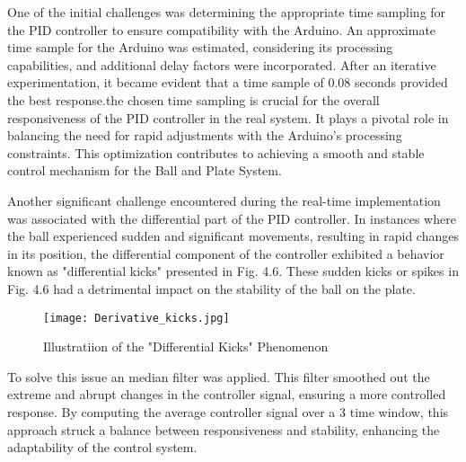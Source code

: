 One of the initial challenges was determining the appropriate time sampling for the PID controller to ensure compatibility with the Arduino. An approximate time sample for the Arduino was estimated, considering its processing capabilities, and additional delay factors were incorporated. After an iterative experimentation, it became evident that a time sample of 0.08 seconds provided the best response.the chosen time sampling is crucial for the overall responsiveness of the PID controller in the real system. It plays a pivotal role in balancing the need for rapid adjustments with the Arduino's processing constraints. This optimization contributes to achieving a smooth and stable control mechanism for the Ball and Plate System.
\begin{onehalfspacing}
Another significant challenge encountered during the real-time implementation was associated with the differential part of the PID controller. In instances where the ball experienced sudden and significant movements, resulting in rapid changes in its position, the differential component of the controller exhibited a behavior known as "differential kicks" presented in Fig. 4.6. These sudden kicks or spikes in Fig. 4.6 had a detrimental impact on the stability of the ball on the plate.


\begin{figure}[h]
    \centering
    \texttt{[image: Derivative\_kicks.jpg]}
    \caption{Illustratiion of the "Differential Kicks" Phenomenon }
    \label{fig:enter-label}
\end{figure}
To solve this issue an median filter was applied. This filter smoothed out the extreme and abrupt changes in the controller signal, ensuring a more controlled response. By computing the average controller signal over a 3 time window, this approach struck a balance between responsiveness and stability, enhancing the adaptability of the control system.
\end{onehalfspacing}



